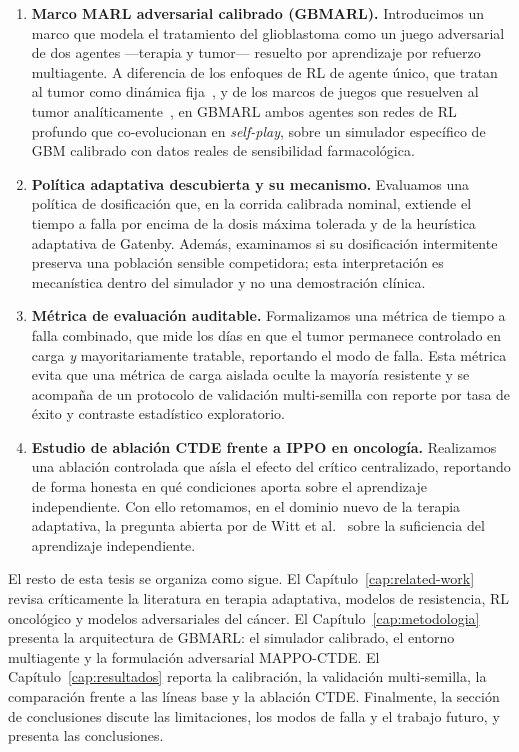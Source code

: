 \begin{enumerate}
  \item \textbf{Marco MARL adversarial calibrado (GBMARL).} Introducimos un marco que modela el tratamiento del glioblastoma como un juego adversarial de dos agentes ---terapia y tumor--- resuelto por aprendizaje por refuerzo multiagente. A diferencia de los enfoques de RL de agente único, que tratan al tumor como dinámica fija~\cite{Gallagher2024}, y de los marcos de juegos que resuelven al tumor analíticamente~\cite{Stankova2019,Salvioli2024}, en GBMARL ambos agentes son redes de RL profundo que co-evolucionan en \emph{self-play}, sobre un simulador específico de GBM calibrado con datos reales de sensibilidad farmacológica.

  \item \textbf{Política adaptativa descubierta y su mecanismo.} Evaluamos una política de dosificación que, en la corrida calibrada nominal, extiende el tiempo a falla por encima de la dosis máxima tolerada y de la heurística adaptativa de Gatenby. Además, examinamos si su dosificación intermitente preserva una población sensible competidora; esta interpretación es mecanística dentro del simulador y no una demostración clínica.

  \item \textbf{Métrica de evaluación auditable.} Formalizamos una métrica de tiempo a falla combinado, que mide los días en que el tumor permanece controlado en carga \emph{y} mayoritariamente tratable, reportando el modo de falla. Esta métrica evita que una métrica de carga aislada oculte la mayoría resistente y se acompaña de un protocolo de validación multi-semilla con reporte por tasa de éxito y contraste estadístico exploratorio.

  \item \textbf{Estudio de ablación CTDE frente a IPPO en oncología.} Realizamos una ablación controlada que aísla el efecto del crítico centralizado, reportando de forma honesta en qué condiciones aporta sobre el aprendizaje independiente. Con ello retomamos, en el dominio nuevo de la terapia adaptativa, la pregunta abierta por de Witt et al.~\cite{deWitt2020} sobre la suficiencia del aprendizaje independiente.
\end{enumerate}

El resto de esta tesis se organiza como sigue. El Capítulo~\ref{cap:related-work} revisa críticamente la literatura en terapia adaptativa, modelos de resistencia, RL oncológico y modelos adversariales del cáncer. El Capítulo~\ref{cap:metodologia} presenta la arquitectura de GBMARL: el simulador calibrado, el entorno multiagente y la formulación adversarial MAPPO-CTDE. El Capítulo~\ref{cap:resultados} reporta la calibración, la validación multi-semilla, la comparación frente a las líneas base y la ablación CTDE. Finalmente, la sección de conclusiones discute las limitaciones, los modos de falla y el trabajo futuro, y presenta las conclusiones.
